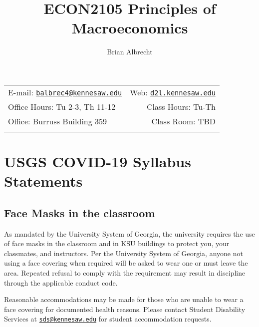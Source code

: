 \documentclass[11pt,]{article}
\title{ECON2105 Principles of Macroeconomics}
\author{Brian Albrecht}
\date{}
\begin{document}
  

		\maketitle
		
	
		\thispagestyle{firststyle}



	\noindent \begin{tabular*}{\textwidth}{ @{\extracolsep{\fill}} lr @{\extracolsep{\fill}}}


E-mail: \texttt{\href{mailto:balbrec4@kennesaw.edu}{\nolinkurl{balbrec4@kennesaw.edu}}} & Web: \href{http://d2l.kennesaw.edu}{\tt d2l.kennesaw.edu}\\
Office Hours: Tu 2-3, Th 11-12  &  Class Hours: Tu-Th\\
Office: Burruss Building 359  & Class Room: TBD\\
	&  \\
	\hline
	\end{tabular*}
	
\vspace{2mm}
	


\hypertarget{usgs-covid-19-syllabus-statements}{%
\section{USGS COVID-19 Syllabus Statements}\label{usgs-covid-19-syllabus-statements}}

\hypertarget{face-masks-in-the-classroom}{%
\subsection{Face Masks in the classroom}\label{face-masks-in-the-classroom}}

As mandated by the University System of Georgia, the university requires the use of face masks in the
classroom and in KSU buildings to protect you, your classmates, and instructors. Per the University System of
Georgia, anyone not using a face covering when required will be asked to wear one or must leave the area.
Repeated refusal to comply with the requirement may result in discipline through the applicable conduct code.

Reasonable accommodations may be made for those who are unable to wear a face covering for documented
health reasons. Please contact Student Disability Services at \href{mailto:sds@kennesaw.edu}{\nolinkurl{sds@kennesaw.edu}} for student accommodation
requests.
\end{document}
